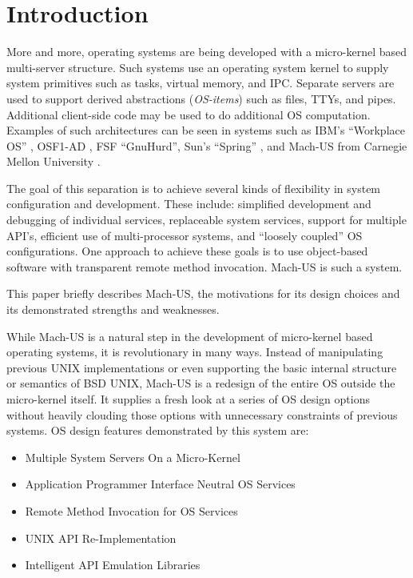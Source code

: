 \section{Introduction}

More and more, operating systems are being developed with a micro-kernel based
multi-server structure.
Such systems use an operating system kernel to
supply system primitives such as tasks,
virtual memory, and IPC.  Separate
servers are used to support derived abstractions ({\em OS-items})
such as files, TTYs, and pipes.
Additional client-side code may be used to do additional OS computation.
Examples of such architectures can be seen in systems such as
IBM's ``Workplace OS'' \cite{IBM-WPOS},
OSF1-AD \cite{OSF-AD},
FSF ``GnuHurd'',  Sun's ``Spring'' \cite{SPRING-UNIX},
and Mach-US from Carnegie Mellon University \cite{MachUS}.

The goal of this separation is to achieve several kinds of
flexibility in system configuration and development.  These
include:
simplified development and debugging of individual services,
replaceable system services,
support for multiple API's,
efficient use of multi-processor systems,
and ``loosely coupled'' OS configurations.
One approach to achieve
these goals is to use object-based
software with transparent remote method invocation.
Mach-US is such a system.

This paper briefly describes Mach-US,
the motivations for its design choices
and its demonstrated strengths and weaknesses.

While Mach-US is a natural step in the development
of micro-kernel based operating
systems, it is revolutionary in many ways.  Instead of manipulating previous
UNIX implementations or even supporting the basic internal structure or
semantics of BSD UNIX, Mach-US is a redesign of the entire OS outside
the micro-kernel itself.
It supplies a fresh look at a series of OS design options without
heavily clouding those options with unnecessary
constraints of previous systems.
OS design features demonstrated by this system are:
\begin{itemize}
\item{Multiple System Servers On a Micro-Kernel}
\item{Application Programmer Interface Neutral OS Services}
\item{Remote Method Invocation for OS Services}
\item{UNIX API Re-Implementation}
\item{Intelligent API Emulation Libraries}
\end{itemize}

